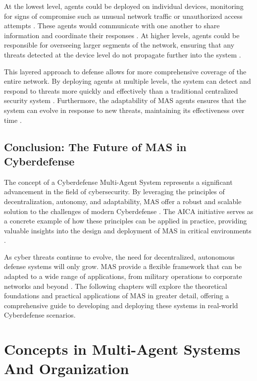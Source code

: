 At the lowest level, agents could be deployed on individual devices, monitoring for signs of compromise such as unusual network traffic or unauthorized access attempts \cite{kolias2016swarm}. These agents would communicate with one another to share information and coordinate their responses \cite{shamshirband2018computational}. At higher levels, agents could be responsible for overseeing larger segments of the network, ensuring that any threats detected at the device level do not propagate further into the system \cite{hu2018mimic}.

This layered approach to defense allows for more comprehensive coverage of the entire network. By deploying agents at multiple levels, the system can detect and respond to threats more quickly and effectively than a traditional centralized security system \cite{bou-harb2017cyber}. Furthermore, the adaptability of MAS agents ensures that the system can evolve in response to new threats, maintaining its effectiveness over time \cite{haider2020artificial}.

\subsection{Conclusion: The Future of MAS in Cyberdefense}

The concept of a Cyberdefense Multi-Agent System represents a significant advancement in the field of cybersecurity. By leveraging the principles of decentralization, autonomy, and adaptability, MAS offer a robust and scalable solution to the challenges of modern Cyberdefense \cite{kolias2011swarm}. The AICA initiative serves as a concrete example of how these principles can be applied in practice, providing valuable insights into the design and deployment of MAS in critical environments \cite{bou-harb2014cyber}.

As cyber threats continue to evolve, the need for decentralized, autonomous defense systems will only grow. MAS provide a flexible framework that can be adapted to a wide range of applications, from military operations to corporate networks and beyond \cite{jahanbin2013computer}. The following chapters will explore the theoretical foundations and practical applications of MAS in greater detail, offering a comprehensive guide to developing and deploying these systems in real-world Cyberdefense scenarios.



\section{Concepts in Multi-Agent Systems And Organization}

